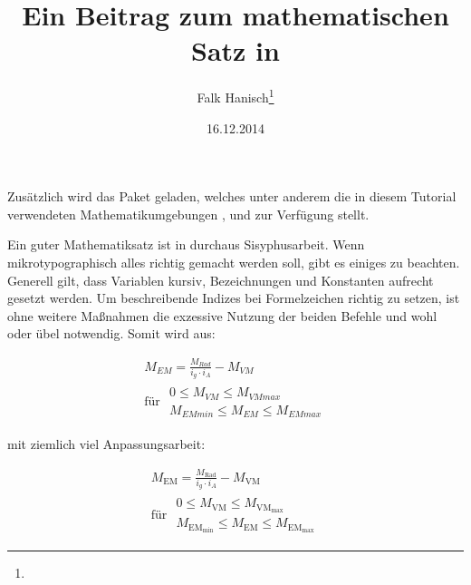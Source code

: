 \documentclass[english,ngerman]{tudscrartcl}
\begin{document}
\date{16.12.2014}
\author{Falk Hanisch\thanks{\noexpand\scriptsize\noexpand\Email{\tudscrmail}}}
\title{Ein Beitrag zum mathematischen Satz in }
\makeatletter
\begingroup%
  \def\and{, }%
  \let\thanks\@gobble%
  \let\footnote\@gobble%
\endgroup%
\markright{\@title}
\makeatother
\StartTutorial
%
%
Zusätzlich wird das Paket  geladen, welches unter anderem die 
in diesem Tutorial verwendeten Mathematikumgebungen , 
 und  zur Verfügung stellt.
%
\begin{Preamble}
\usepackage{amsmath}
\end{Preamble}
%
Ein guter Mathematiksatz ist in  durchaus Sisyphusarbeit. Wenn 
mikrotypographisch alles richtig gemacht werden soll, gibt es einiges zu 
beachten. Generell gilt, dass Variablen kursiv, Bezeichnungen und Konstanten
aufrecht gesetzt werden. Um beschreibende Indizes bei Formelzeichen richtig zu 
setzen, ist ohne weitere Maßnahmen die exzessive Nutzung der beiden Befehle 
\PParameter{\dots} und \PParameter{\dots} wohl oder 
übel notwendig. Somit wird aus:
%
\begin{Trunk*}
\begin{equation*}
\begin{gathered}
M_{EM} =  - M_{VM} \\
\textrm{für }
\begin{aligned}
0\leq M_{VM}\leq M_{VMmax} \\ 
M_{EMmin}\leq M_{EM}\leq M_{EMmax}
\end{aligned}
\end{gathered}
\end{equation*}

\end{Trunk*}
%
mit ziemlich viel Anpassungsarbeit:
%
\begin{Trunk*}
\begin{equation*}
\begin{gathered}
M_ =  - M_ \\
\textrm{für }
\begin{aligned}
0\leq M_\leq M_ \\ 
M_\leq M_\leq M_
\end{aligned}
\end{gathered}
\end{equation*}

\end{Trunk*}
\end{document}
